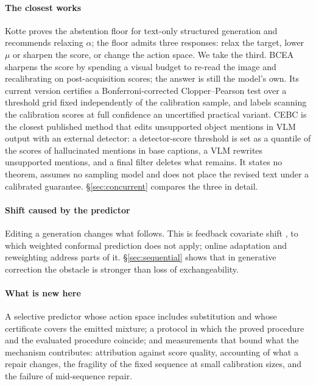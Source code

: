 \paragraph{The closest works}
Kotte \citep{crcimposs} proves the abstention floor for text-only structured generation and
recommends relaxing $\alpha$; the floor admits three responses: relax the target, lower $\mu$ or
sharpen the score, or change the action space. We take the third. BCEA \citep{bcea} sharpens the
score by spending a visual budget to re-read the image and recalibrating on post-acquisition
scores; the answer is still the model's own. Its current version certifies a Bonferroni-corrected
Clopper--Pearson test over a threshold grid fixed independently of the calibration sample, and
labels scanning the calibration scores at full confidence an uncertified practical variant.
CEBC \citep{mishra2026cebc} is the closest published method that edits unsupported object
mentions in VLM output with an external detector: a detector-score threshold is set as a
quantile of the scores of hallucinated mentions in base captions, a VLM rewrites unsupported
mentions, and a final filter deletes what remains. It states no theorem, assumes no sampling
model and does not place the revised text under a calibrated guarantee. \S\ref{sec:concurrent}
compares the three in detail.

\paragraph{Shift caused by the predictor}
Editing a generation changes what follows. This is feedback covariate shift
\citep{fannjiang2022fcs}, to which weighted conformal prediction \citep{tibshirani2019} does not
apply; online adaptation \citep{gibbs2021,onlineabstention} and reweighting \citep{anydist}
address parts of it. \S\ref{sec:sequential} shows that in generative correction the obstacle is
stronger than loss of exchangeability.

\paragraph{What is new here}
A selective predictor whose action space includes substitution and whose certificate covers the
emitted mixture; a protocol in which the proved procedure and the evaluated procedure coincide;
and measurements that bound what the mechanism contributes: attribution against score quality, accounting
of what a repair changes, the fragility of the fixed sequence at small calibration sizes, and the
failure of mid-sequence repair.

